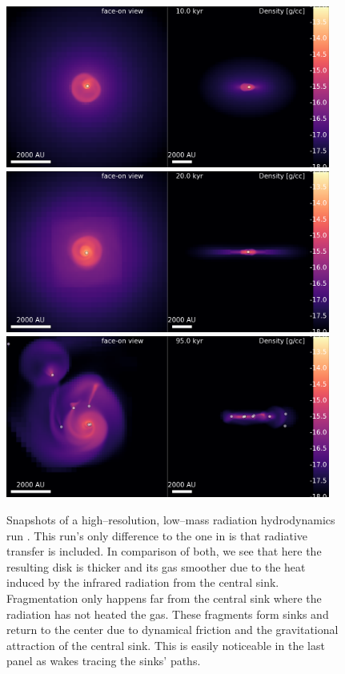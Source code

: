 \begin{figure}[!htb]
 \centering
 \includegraphics[width=0.95\textwidth]{Figures/rhd/multi_00039}
 \includegraphics[width=0.95\textwidth]{Figures/rhd/multi_00079}
 \includegraphics[width=0.95\textwidth]{Figures/rhd/multi_00379}
 \captionsetup{justification=justified,singlelinecheck=false,width=\linewidth}
 \decoRule
 \caption[Radiation hydrodynamical sphere collapse]{Snapshots of a high--resolution, low--mass radiation hydrodynamics run .
                                                    This run's only difference to the one in  is that radiative transfer is included.
                                                    In comparison of both, we see that here the resulting disk is thicker and its gas smoother due to the heat induced by the infrared radiation from the central sink.
                                                    Fragmentation only happens far from the central sink where the radiation has not heated the gas.
                                                    These fragments form sinks and return to the center due to dynamical friction and the gravitational attraction of the central sink.
                                                    This is easily noticeable in the last panel as wakes tracing the sinks' paths.}
\label{fig:rhd_snapshots}
\end{figure}
\FloatBarrier


